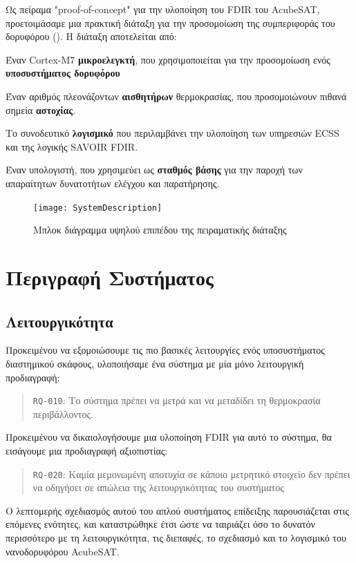 \documentclass[a4paper,nobib]{tufte-book}
\begin{document}
Ως πείραμα "proof-of-concept" για την υλοποίηση του \ac{FDIR} του AcubeSAT, προετοιμάσαμε μια πρακτική διάταξη για την προσομοίωση της συμπεριφοράς του δορυφόρου (). Η διάταξη αποτελείται από:
\begin{compactitem}
	\item Έναν Cortex-M7 \textbf{μικροελεγκτή}, που χρησιμοποιείται για την προσομοίωση ενός \textbf{υποσυστήματος δορυφόρου}
	\item Έναν αριθμός πλεονάζοντων \textbf{αισθητήρων} θερμοκρασίας, που προσομοιώνουν πιθανά σημεία \textbf{αστοχίας}.
	\item Το συνοδευτικό \textbf{λογισμικό} που περιλαμβάνει την υλοποίηση των υπηρεσιών \ac{ECSS} και της λογικής \ac{SAVOIR} \ac{FDIR}.
	\item Έναν υπολογιστή, που χρησιμεύει ως \textbf{σταθμός βάσης} για την παροχή των απαραίτητων δυνατοτήτων ελέγχου και παρατήρησης.
\end{compactitem}

\begin{figure}[h]
	\texttt{[image: SystemDescription]}
	\caption{Μπλοκ διάγραμμα υψηλού επιπέδου της πειραματικής διάταξης}
	\label{fig:block}
\end{figure}
\section{Περιγραφή Συστήματος}

\subsection{Λειτουργικότητα}
\label{sec:tsvcd}

Προκειμένου να εξομοιώσουμε τις πιο βασικές λειτουργίες ενός υποσυστήματος διαστημικού σκάφους, υλοποιήσαμε ένα σύστημα με μία μόνο λειτουργική προδιαγραφή:
\begin{quote}
	\texttt{RQ-010}: Το σύστημα πρέπει να μετρά και να μεταδίδει τη θερμοκρασία περιβάλλοντος.
\end{quote}

Προκειμένου να δικαιολογήσουμε μια υλοποίηση \ac{FDIR} για αυτό το σύστημα, θα εισάγουμε μια προδιαγραφή αξιοπιστίας:
\begin{quote}
	\texttt{RQ-020}: Καμία μεμονωμένη αποτυχία σε κάποιο μετρητικό στοιχείο δεν πρέπει να οδηγήσει σε απώλεια της λειτουργικότητας του συστήματος
\end{quote}

Ο λεπτομερής σχεδιασμός αυτού του απλού συστήματος επίδειξης παρουσιάζεται στις επόμενες ενότητες, και καταστρώθηκε έτσι ώστε να ταιριάζει όσο το δυνατόν περισσότερο με τη λειτουργικότητα, τις διεπαφές, το σχεδιασμό και το λογισμικό του νανοδορυφόρου AcubeSAT.
\end{document}
